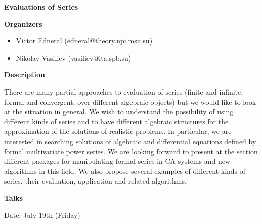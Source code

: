 \begin{center}
{\LARGE \bf Evaluations of Series
}
\end{center}
\bigskip

{\bf Organizers}

\medskip

\begin{itemize}

\item
Victor Edneral (edneral@theory.npi.msu.su)
\item
Nikolay Vasiliev (vasiliev@ita.spb.su)

\end{itemize}
\bigskip

{\bf Description}
\medskip

There are many partial approaches to evaluation of series (finite and infinite, formal and
convergent, over different algebraic objects) but we would like to look at the situation in general.
We wish to understand the possibility of using different kinds of series and to have different
algebraic structures for the approximation of the solutions of realistic problems. In particular, we
are interested in searching solutions of algebraic and differential equations defined by formal
multivariate power series. We are looking forward to present at the section different packages for
manipulating formal series in CA systems and new algorithms in this field. We also propose
several examples of different kinds of series, their evaluation, application and related algorithms. 

\bigskip
{\bf Talks}
\medskip

Date: July 19th (Friday) 


